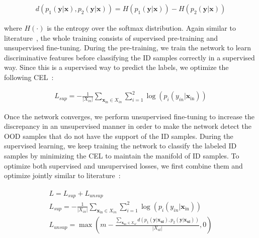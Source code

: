 \vspace{-6mm}
\begin{align}
    d\left(p_{1}(\mathbf{y} | \mathbf{x}), p_{2}(\mathbf{y} | \mathbf{x})\right)=H\left(p_{1}(\mathbf{y} | \mathbf{x})\right)-H\left(p_{2}(\mathbf{y} | \mathbf{x})\right)
    \label{eq:dis_loss_1}
\end{align}

\hspace*{3.5mm} where $H(\cdot)$ is the entropy over the softmax distribution. Again similar to literature~\cite{yu2019unsupervised}, the whole training consists of supervised pre-training and unsupervised fine-tuning. During the pre-training, we train the network to learn discriminative features before classifying the ID samples correctly in a supervised way. Since this is a supervised way to predict the labels, we optimize the following CEL~\cite{yu2019unsupervised}:

\vspace{-6mm}
\begin{align}
    {L}_{sup}=-\frac{1}{\left|X_{i n}\right|} \sum_{\mathbf{x}_{\mathrm{in}} \in X_{i n}} \sum_{i=1}^{2} \log \left(p_{i}\left(y_{i n} | \mathbf{x}_{\mathrm{in}}\right)\right)
\end{align}

\hspace*{3.5mm} Once the network converges, we perform unsupervised fine-tuning to increase the discrepancy in an unsupervised manner in order to make the network detect the OOD samples that do not have the support of the ID samples. During the supervised learning, we keep training the network to classify the labeled ID samples by minimizing the CEL to maintain the manifold of ID samples. To optimize both supervised and unsupervised losses, we first combine them and optimize jointly similar to literature~\cite{yu2019unsupervised}: 

\vspace{-4mm}
\begin{align}
    \begin{array}{c}
        {L}={L}_{sup}+{L}_{unsup} \\ 
        {L}_{sup}=-\frac{1}{\left|X_{i n}\right|} \sum_{\mathbf{x}_{\mathrm{in}} \in X_{in}} \sum_{i=1}^{2} \log \left(p_{i}\left(y_{i n} | \mathbf{x}_{\mathrm{in}}\right)\right) \\ 
        {L}_{unsup}=\max \left(m-\frac{\sum_{\mathbf{x}_{\mathbf{u} 1} \in X_{ul}} d\left(p_{1}\left(\mathbf{y} | \mathbf{x}_{\mathbf{ul}}\right), p_{2}\left(\mathbf{y} | \mathbf{x}_{\mathbf{ul}}\right)\right)} {\left|X_{ul}\right|},0\right)
    \end{array}
    \label{eq:ood_join_loss}
\end{align}

